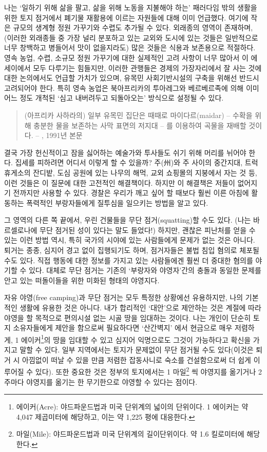 \documentclass[10pt, b6paper, openany]{memoir}
\begin{document}
\begin{article}
나는 `일하기 위해 삶을 팔고, 삶을 위해 노동을 지불해야 하는' 패러다임 밖의 생활을 위한 토지 점거에서 폐기물 재활용에 이르는 자원들에 대해 이미 언급했다. 여기에 작은 규모의 생계형 정원 가꾸기와 수렵도 추가될 수 있다. 외래종의 영역이 존재하며, (이러한 외래종들 중 가장 널리 분포하고 있는 교외와 도시에 있는 것들은 일반적으로 너무 창백하고 병들어서 맛이 없을지라도) 많은 것들은 식용과 보존용으로 적절하다. 영속 농업, 수렵, 소규모 정원 가꾸기에 대한 실제적인 고려 사항이 너무 많아서 이 에세이에서 모두 다루기는 힘들지만, 이러한 관행들은 경제의 가장자리에서 잘 사는 것에 대한 논의에서도 언급할 가치가 있으며, 유목민 사회기반시설의 구축을 위해선 반드시 고려되어야 한다. 특히 영속 농업은 북아프리카의 투아레그와 베르베르족에 의해 이미 어느 정도 개척된 `심고 내버려두고 되돌아오는' 방식으로 설정될 수 있다.

\begin{quote}
(아프리카 사하라의) 일부 유목민 집단은 때때로 마이다르(maidar) -- 수확을 위해 충분한 물을 보존하는 사막 표면의 저지대 -- 를 이용하여 곡물을 재배할 것이다. -- , 1991년 본문
\end{quote}

결국 가장 헌신적이고 잠을 싫어하는 예술가와 투사들도 쉬기 위해 머리를 뉘어야 한다. 집세를 피하려면 어디서 이렇게 할 수 있을까? 주(州)와 주 사이의 중간지대, 트럭 휴게소의 잔디밭, 도심 공원에 있는 나무의 해먹, 교외 쇼핑몰의 지붕에서 자는 것 등, 이런 것들은 이 질문에 대한 고전적인 해결책이다. 하지만 이 해결책은 저들이 없어지기 전까지만 사용할 수 있다. 경찰은 우리가 깨고 싶어 할 때보다 훨씬 이른 아침에 활동하는 폭력적인 부랑자들에게 질투심을 일으키는 방법을 알고 있다.

그 영역의 다른 쪽 끝에서, 우린 건물들을 무단 점거(squatting)할 수도 있다. (나는 바르셀로나에 무단 점거된 성이 있다는 말도 들었다!) 하지만, 괜찮은 피난처를 얻을 수 있는 이런 방법 역시, 특히 국가의 시야에 있는 사람들에게 문제가 없는 것은 아니다. 퇴거는 종종, 심지어 경고 없이 집행되기도 하며, 점거자들은 불법 침입 혐의로 체포될 수도 있다. 직접 행동에 대한 정보를 가지고 있는 사람들에겐 훨씬 더 중대한 혐의를 야기할 수 있다. 대체로 무단 점거는 기존의 ‘부랑자와 야영자’간의 충돌과 동일한 문제를 안고 있는 떠돌이들을 위한 미화된 형태의 야영지다.

자유 야영(free camping)과 무단 점거는 모두 특정한 상황에선 유용하지만, 나의 기본적인 생활에 유용한 것은 아니다. 내가 합리적인 `대안'으로 제안하는 것은 계절에 따라 야영을 할 목적으로 편의시설 없는 시골 땅을 임대하는 것이다. 나는 개인이 단순히 토지 소유자들에게 제안을 함으로써 필요하다면 `산간벽지' 에서 현금으로 매우 저렴하게, 1 에이커\footnote{에이커(Acre): 야드파운드법과 미국 단위계의 넓이의 단위이다. 1 에이커는 약 4,047 제곱미터에 해당하고, 이는 약 1,225 평에 대응한다.}의 땅을 임대할 수 있고 심지어 익명으로도 그것이 가능하다고 확신을 가지고 말할 수 있다. 일부 지역에서는 토지가 문제없이 무단 점거될 수도 있다(이것은 퇴거 시 아낌없이 떠날 수 있을 만큼 저렴한 잡동사니로 숙소를 건설함으로써 더 쉽게 이루어질 수 있다). 또한 중요한 것은 정부의 토지에서는 1 마일\footnote{마일(Mile): 야드파운드법과 미국 단위계의 길이단위이다. 약 1.6 킬로미터에 해당한다.} 씩 야영지를 옮기거나 2주마다 야영지를 옮기는 한 무기한으로 야영할 수 있다는 점이다.


\end{article}
\end{document}
